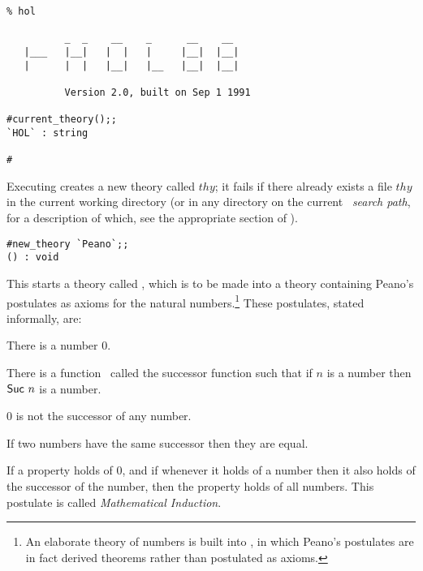 {\setcounter{sessioncount}{1}
\begin{session}\begin{verbatim}
% hol

          _  _    __    _      __    __
   |___   |__|   |  |   |     |__|  |__|
   |      |  |   |__|   |__   |__|  |__|
   
          Version 2.0, built on Sep 1 1991

#current_theory();;
`HOL` : string

#
\end{verbatim}\end{session}

Executing  creates a new  theory called  $thy$; it fails
if there already exists a file $thy$ in the current working
directory (or in any directory on the current \HOL\ {\it search path\/},
for a description of  which, see  the appropriate  section of  
\DESCRIPTION).

\begin{session}\begin{verbatim}
#new_theory `Peano`;;
() : void
\end{verbatim}\end{session}

\noindent This starts a theory called ,  which is  to be  made into a
theory containing Peano's postulates as axioms for the natural
numbers.\footnote{An elaborate theory of numbers is built into \HOL, in which
Peano's postulates  are  in  fact  derived  theorems rather  than postulated as
axioms.}  These postulates, stated informally, are:

\begin{list}{{\small\bf P}}{
\setlength{\leftmargin}{12mm}
\setlength{\rightmargin}{7mm}
\setlength{\labelwidth}{6mm}
\setlength{\labelsep}{2mm}
\setlength{\listparindent}{0mm}
\setlength{\itemsep}{14pt plus1pt minus1pt}
\setlength{\topsep}{3mm}
\setlength{\parsep}{0mm}}

\item There is a number $0$.
\item There is a function \Suc\ called the successor function such that 
if $n$ is a number then ${\sf Suc} \ n$ is a number.
\item $0$ is not the successor of any number.
\item If two numbers have the same successor then they are equal.
\item If a property holds of $0$, and if whenever it holds of a number then it
also holds of the successor of the number, then the property holds of all
numbers. This postulate is called {\it Mathematical Induction}.
\end{list}

}
